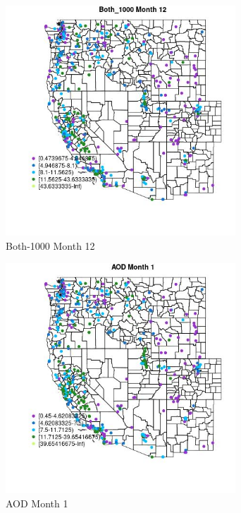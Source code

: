 \begin{figure} 
\centering  
\includegraphics[width=0.77\textwidth]{Code_Outputs/ML_input_report_ML_input_PM25_Step5_part_d_de_duplicated_aves_ML_input_MapObsMo12Both_1000.jpg} 
\caption{\label{fig:ML_input_report_ML_input_PM25_Step5_part_d_de_duplicated_aves_ML_inputMapObsMo12Both_1000}Both-1000 Month 12} 
\end{figure} 
 

\begin{figure} 
\centering  
\includegraphics[width=0.77\textwidth]{Code_Outputs/ML_input_report_ML_input_PM25_Step5_part_d_de_duplicated_aves_ML_input_MapObsMo1AOD.jpg} 
\caption{\label{fig:ML_input_report_ML_input_PM25_Step5_part_d_de_duplicated_aves_ML_inputMapObsMo1AOD}AOD Month 1} 
\end{figure} 
 

